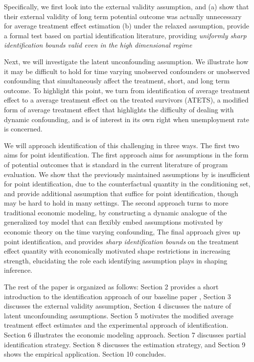 \documentclass[uplatex,dvipdfmx]{jsarticle}
\begin{document}
Specifically, we first look into the external validity assumption, and (a) show that their external validity of long term potential outcome was actually unnecessary for average treatment effect estimation (b) under the relaxed assumption, provide a formal test based on partial identification literature, providing \textit{uniformly sharp identification bounds valid even in the high dimensional regime}

Next, we will investigate the latent unconfounding assumption. We illustrate how it may be difficult to hold for time varying unobserved confounders or unobserved confounding that simultaneously affect the treatment, short, and long term outcome. To highlight this point, we turn from identification of average treatment effect to a average treatment effect on the treated survivors (ATETS), a modified form of average treatment effect that highlights the difficulty of dealing with dynamic confounding, and is of interest in its own right when unemployment rate is concerned. 

We will approach identification of this challenging in three ways. The first two aims for point identification. The first approach aims for assumptions in the form of potential outcomes that is standard in the current literature of program evaluation. We show that the previously maintained assumptions by \cite{athey2020combining}is insufficient for point identification, due to the counterfactual quantity in the conditioning set, and provide additional assumption that suffice for point identification, though may be hard to hold in many settings. The second approach turns to more traditional economic modeling, by constructing a dynamic analogue of the generalized toy model\cite{heckman2007dynamic} \cite{roy1951some}that can flexibly embed assumptions motivated by economic theory on the time varying confounding, The final approach gives up point identification, and provides \textit{sharp identification bounds }on the treatment effect quantity with economically motivated shape restrictions in increasing strength, elucidating the role each identifying assumption plays in shaping inference.

The rest of the paper is organized as follows: Section 2 provides a short introduction to the identification approach of our baseline paper \cite{athey2020combining}, Section 3 discusses the external validity assumption, Section 4 discusses the nature of latent unconfounding assumptions. Section 5 motivates the modified average treatment effect estimates and the experimental approach of identification. Section 6 illustrates the economic modeling approach. Section 7 discusses partial identification strategy. Section 8 discusses the estimation strategy, and Section 9 shows the empirical application. Section 10 concludes.
\end{document}
